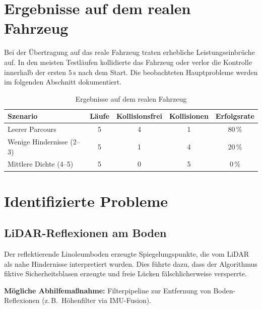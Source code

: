 \section{Ergebnisse auf dem realen Fahrzeug}
\label{sec:real_results}

Bei der Übertragung auf das reale Fahrzeug traten erhebliche
Leistungseinbrüche auf.
In den meisten Testläufen kollidierte das Fahrzeug oder verlor
die Kontrolle innerhalb der ersten $5\,\text{s}$ nach dem Start.
Die beobachteten Hauptprobleme werden im folgenden Abschnitt
dokumentiert.

\begin{table}[H]
  \centering
  \caption{Ergebnisse auf dem realen Fahrzeug}
  \label{tab:real_results}
  \begin{tabular}{@{}lcccc@{}}
    \toprule
    \textbf{Szenario}  & \textbf{Läufe}
      & \textbf{Kollisionsfrei} & \textbf{Kollisionen}
      & \textbf{Erfolgsrate} \\
    \midrule
    Leerer Parcours               & 5 & 4 & 1 & 80\,\% \\
    Wenige Hindernisse (2--3)     & 5 & 1 & 4 & 20\,\% \\
    Mittlere Dichte (4--5)        & 5 & 0 & 5 &  0\,\% \\
    \bottomrule
  \end{tabular}
\end{table}

\section{Identifizierte Probleme}
\label{sec:problems}

\subsection{LiDAR-Reflexionen am Boden}
\label{subsec:reflections}

Der reflektierende Linoleumboden erzeugte Spiegelungspunkte,
die vom LiDAR als nahe Hindernisse interpretiert wurden.
Dies führte dazu, dass der Algorithmus fiktive Sicherheitsblasen
erzeugte und freie Lücken fälschlicherweise versperrte.

\textbf{Mögliche Abhilfemaßnahme:} Filterpipeline zur Entfernung
von Boden-Reflexionen (z.\,B.\ Höhen\-filter via IMU-Fusion).

